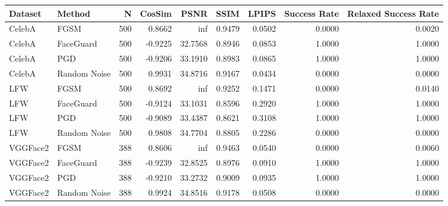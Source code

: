 \begin{tabular}{llrrrrrrr}
\toprule
Dataset & Method & N & CosSim & PSNR & SSIM & LPIPS & Success Rate & Relaxed Success Rate \\
\midrule
CelebA & FGSM & 500 & 0.8662 & inf & 0.9479 & 0.0502 & 0.0000 & 0.0020 \\
CelebA & FaceGuard & 500 & -0.9225 & 32.7568 & 0.8946 & 0.0853 & 1.0000 & 1.0000 \\
CelebA & PGD & 500 & -0.9206 & 33.1910 & 0.8983 & 0.0865 & 1.0000 & 1.0000 \\
CelebA & Random Noise & 500 & 0.9931 & 34.8716 & 0.9167 & 0.0434 & 0.0000 & 0.0000 \\
LFW & FGSM & 500 & 0.8692 & inf & 0.9252 & 0.1471 & 0.0000 & 0.0140 \\
LFW & FaceGuard & 500 & -0.9124 & 33.1031 & 0.8596 & 0.2920 & 1.0000 & 1.0000 \\
LFW & PGD & 500 & -0.9089 & 33.4387 & 0.8621 & 0.3108 & 1.0000 & 1.0000 \\
LFW & Random Noise & 500 & 0.9808 & 34.7704 & 0.8805 & 0.2286 & 0.0000 & 0.0000 \\
VGGFace2 & FGSM & 388 & 0.8606 & inf & 0.9463 & 0.0540 & 0.0000 & 0.0060 \\
VGGFace2 & FaceGuard & 388 & -0.9239 & 32.8525 & 0.8976 & 0.0910 & 1.0000 & 1.0000 \\
VGGFace2 & PGD & 388 & -0.9210 & 33.2732 & 0.9009 & 0.0935 & 1.0000 & 1.0000 \\
VGGFace2 & Random Noise & 388 & 0.9924 & 34.8516 & 0.9178 & 0.0508 & 0.0000 & 0.0000 \\
\bottomrule
\end{tabular}
